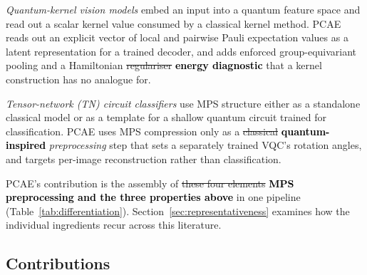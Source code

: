 \documentclass[pdflatex,sn-basic]{sn-jnl}
\newcommand{\del}[1]{\sout{#1}}
\newcommand{\add}[1]{\textbf{\textcolor{black}{#1}}}
\begin{document}
\emph{Quantum-kernel vision models}
\citep{Havlicek2019, QuantumKernelDefect2022} embed an input into a quantum
feature space and read out a scalar kernel value consumed by a classical kernel
method. PCAE reads out an explicit vector of local and pairwise Pauli expectation
values as a latent representation for a trained decoder, and adds enforced
group-equivariant pooling and a Hamiltonian \del{regulariser} \add{energy diagnostic} that a kernel
construction has no analogue for.

\emph{Tensor-network (TN) circuit classifiers}
\citep{Guala2023, Stoudenmire2016, Han2018} use MPS structure either as a
standalone classical model or as a template for a shallow quantum circuit trained
for classification. PCAE uses MPS compression only as a \del{classical} \add{quantum-inspired}
\emph{preprocessing} step that sets a separately trained VQC's rotation angles,
and targets per-image reconstruction rather than classification.

PCAE's contribution is the assembly of \del{these four elements} \add{MPS preprocessing and the three properties above} in one pipeline
(Table~\ref{tab:differentiation}). Section~\ref{sec:representativeness} examines
how the individual ingredients recur across this literature.

\subsection*{Contributions}
\end{document}
